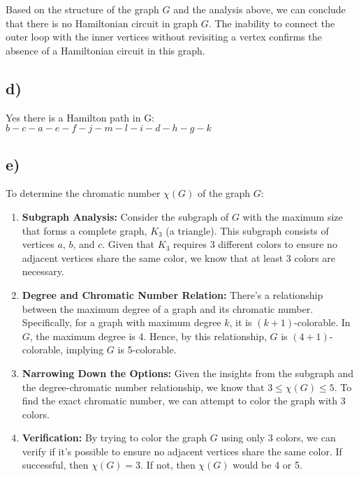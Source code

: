\documentclass[12pt]{article}
\begin{document}
Based on the structure of the graph \( G \) and the analysis above, we can conclude that there is no Hamiltonian circuit in graph \( G \). The inability to connect the outer loop with the inner vertices without revisiting a vertex confirms the absence of a Hamiltonian circuit in this graph.


\subsection*{d)}

Yes there is a Hamilton path in G: \(  b - c - a - e - f - j - m - l - i-d-h-g-k \)

\subsection*{e)}

To determine the chromatic number \( \chi(G) \) of the graph \( G \):

\begin{enumerate}
    \item \textbf{Subgraph Analysis:} Consider the subgraph of \( G \) with the maximum size that forms a complete graph, \( K_3 \) (a triangle). This subgraph consists of vertices \( a \), \( b \), and \( c \). Given that \( K_3 \) requires 3 different colors to ensure no adjacent vertices share the same color, we know that at least 3 colors are necessary.
    
    \item \textbf{Degree and Chromatic Number Relation:} There's a relationship between the maximum degree of a graph and its chromatic number. Specifically, for a graph with maximum degree \( k \), it is \( (k+1) \)-colorable. In \( G \), the maximum degree is 4. Hence, by this relationship, \( G \) is \( (4+1) \)-colorable, implying \( G \) is 5-colorable.
    
    \item \textbf{Narrowing Down the Options:} Given the insights from the subgraph and the degree-chromatic number relationship, we know that \( 3 \leq \chi(G) \leq 5 \). To find the exact chromatic number, we can attempt to color the graph with 3 colors.
    
    \item \textbf{Verification:} By trying to color the graph \( G \) using only 3 colors, we can verify if it's possible to ensure no adjacent vertices share the same color. If successful, then \( \chi(G) = 3 \). If not, then \( \chi(G) \) would be 4 or 5.
\end{enumerate}
\end{document}
